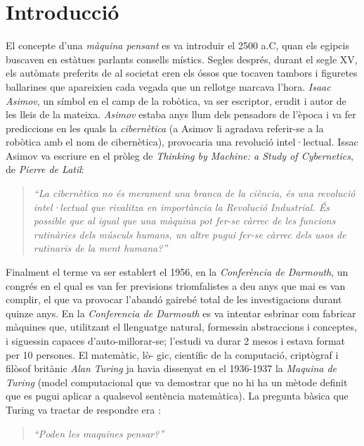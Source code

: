 \section{Introducció}

El concepte d'una \emph{màquina pensant} es va introduir el 2500 a.C, quan els egipcis buscaven en estàtues parlants consells místics. Segles després, durant el segle XV, els autòmats preferits de al societat eren els óssos que tocaven tambors i figuretes ballarines que apareixien cada vegada que un rellotge marcava l'hora. \emph{Isaac Asimov}, un símbol en el camp de la robòtica, va ser escriptor, erudit i autor de les lleis de la mateixa. \emph{Asimov} estaba anys llum dels pensadors de l'època i va fer prediccions en les quals la \emph{cibernètica} (a Asimov li agradava referir-se a la robòtica amb el nom de cibernètica), provocaria una revolució intel·lectual. 
Issac Asimov va escriure en el pròleg de \emph{Thinking by Machine: a Study of Cybernetics}, de \emph{Pierre de Latil}:

\begin{quote}
\emph{``La cibernètica no és merament una branca de la ciència, és una revolució intel·lectual que rivalitza en importància la Revolució Industrial. És possible que al igual que una màquina pot fer-se càrrec de les funcions rutinàries dels músculs humans, un altre pugui fer-se càrrec dels usos de rutinaris de la ment humana?''}

\end{quote}

Finalment el terme va ser establert el 1956, en la \emph{Conferència de Darmouth}, un congrés en el qual es van fer previsions triomfalistes a deu anys que mai es van complir, el que va provocar l'abandó gairebé total de les investigacions durant quinze anys. En la \emph{Conferencia de Darmouth} es va intentar esbrinar com fabricar màquines que, utilitzant el llenguatge natural, formessin abstraccions i conceptes, i siguessin capaces d'auto-millorar-se; l'estudi va durar 2 mesos i estava format per 10 persones. El matemàtic, lò- gic, científic de la computació, criptògraf  i filòsof britànic \emph{Alan Turing} ja havia dissenyat en el 1936-1937 la \emph{Maquina de Turing} (model computacional que va demostrar que no hi ha un mètode definit que es pugui aplicar a qualsevol sentència matemàtica). La pregunta bàsica que Turing va tractar de respondre era \cite{MaTur} \cite{Algor}: 

\begin{quote}
	\emph{``Poden les maquines pensar?''}
\end{quote}

